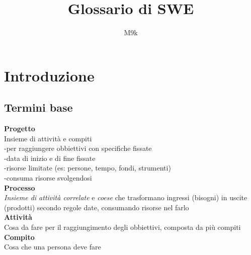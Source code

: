 \documentclass{article}
\begin{document}
\title{Glossario di SWE}
\author{M9k}
\maketitle


\section{Introduzione}
	
	\subsection{Termini base}
		\textbf{Progetto}\\
		Insieme di attività e compiti\\
		-per raggiungere obbiettivi con specifiche fissate\\
		-data di inizio e di fine fissate\\
		-risorse limitate (es: persone, tempo, fondi, strumenti)\\
		-consuma risorse svolgendosi\\
			
		\textbf{Processo}\\
		\textit{Insieme di attività correlate} e \textit{coese} che trasformano ingressi (bisogni) in uscite (prodotti) secondo regole date, consumando risorse nel farlo\\
		
		\textbf{Attività}\\
		Cosa da fare per il raggiungimento degli obbiettivi, composta da più compiti\\
		
		\textbf{Compito}\\
		Cosa che una persona deve fare\\
\end{document}

